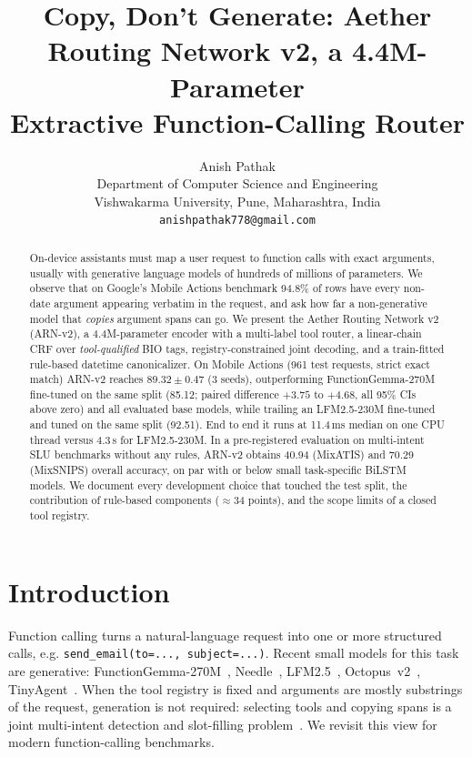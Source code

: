 \documentclass[11pt]{article}
\title{Copy, Don't Generate: Aether Routing Network v2, a 4.4M-Parameter\\Extractive Function-Calling Router}
\author{Anish Pathak\\
\small Department of Computer Science and Engineering\\
\small Vishwakarma University, Pune, Maharashtra, India\\
\small\texttt{anishpathak778@gmail.com}}
\date{}
\newcommand{\arn}{ARN-v2}
\begin{document}
\maketitle

\begin{abstract}
On-device assistants must map a user request to function calls with exact arguments, usually with
generative language models of hundreds of millions of parameters. We observe that on Google's Mobile
Actions benchmark 94.8\% of rows have every non-date argument appearing verbatim in the request, and
ask how far a non-generative model that \emph{copies} argument spans can go. We present the Aether
Routing Network v2 (\arn{}), a 4.4M-parameter encoder with a multi-label tool router, a linear-chain
CRF over \emph{tool-qualified} BIO tags, registry-constrained joint decoding, and a train-fitted
rule-based datetime canonicalizer. On Mobile Actions (961 test requests, strict exact match) \arn{}
reaches $89.32 \pm 0.47$ (3 seeds), outperforming FunctionGemma-270M fine-tuned on the same split
(85.12; paired difference $+3.75$ to $+4.68$, all 95\% CIs above zero) and all evaluated base models,
while trailing an LFM2.5-230M fine-tuned and tuned on the same split (92.51). End to end it runs at
11.4\,ms median on one CPU thread versus 4.3\,s for LFM2.5-230M. In a pre-registered evaluation on
multi-intent SLU benchmarks without any rules, \arn{} obtains 40.94 (MixATIS) and 70.29 (MixSNIPS)
overall accuracy, on par with or below small task-specific BiLSTM models. We document every
development choice that touched the test split, the contribution of rule-based components ($\approx$34
points), and the scope limits of a closed tool registry.
\end{abstract}

\section{Introduction}
Function calling turns a natural-language request into one or more structured calls, e.g.
\texttt{send\_email(to=..., subject=...)}. Recent small models for this task are generative:
FunctionGemma-270M~\cite{functiongemma}, Needle~\cite{needle}, LFM2.5~\cite{lfm25},
Octopus~v2~\cite{octopus}, TinyAgent~\cite{tinyagent}. When the tool registry is fixed and arguments are
mostly substrings of the request, generation is not required: selecting tools and copying spans is a
joint multi-intent detection and slot-filling problem~\cite{jointbert,agif}. We revisit this view for
modern function-calling benchmarks.
\end{document}
